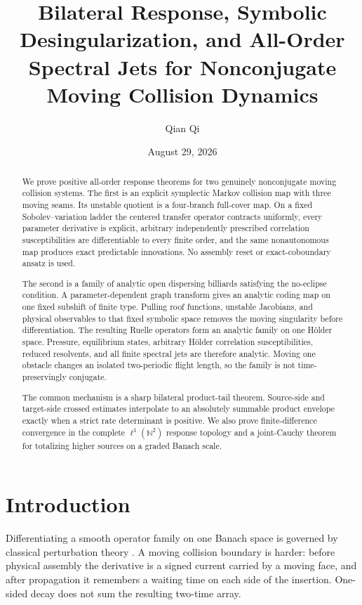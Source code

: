 \documentclass[11pt,reqno]{amsart}
\title[Bilateral response and symbolic desingularization]{Bilateral Response, Symbolic Desingularization, and All-Order Spectral Jets for Nonconjugate Moving Collision Dynamics}
\author{Qian Qi}
\date{August 29, 2026}
\theoremstyle{definition}
\theoremstyle{remark}
\newcommand{\N}{\mathbb N}
\begin{document}
\begin{abstract}
We prove positive all-order response theorems for two genuinely nonconjugate
moving collision systems.  The first is an explicit symplectic Markov collision
map with three moving seams.  Its unstable quotient is a four-branch full-cover
map.  On a fixed Sobolev--variation ladder the centered transfer operator
contracts uniformly, every parameter derivative is explicit, arbitrary
independently prescribed correlation susceptibilities are differentiable to
every finite order, and the same nonautonomous map produces exact predictable
innovations.  No assembly reset or exact-coboundary ansatz is used.

The second is a family of analytic open dispersing billiards satisfying the
no-eclipse condition.  A parameter-dependent graph transform gives an analytic
coding map on one fixed subshift of finite type.  Pulling roof functions,
unstable Jacobians, and physical observables to that fixed symbolic space
removes the moving singularity before differentiation.  The resulting Ruelle
operators form an analytic family on one Hölder space.  Pressure, equilibrium
states, arbitrary Hölder correlation susceptibilities, reduced resolvents, and
all finite spectral jets are therefore analytic.  Moving one obstacle changes
an isolated two-periodic flight length, so the family is not time-preservingly
conjugate.

The common mechanism is a sharp bilateral product-tail theorem.  Source-side
and target-side crossed estimates interpolate to an absolutely summable
product envelope exactly when a strict rate determinant is positive.  We also
prove finite-difference convergence in the complete $\ell^1(\N^2)$ response
topology and a joint-Cauchy theorem for totalizing higher sources on a graded
Banach scale.
\end{abstract}

\maketitle
\tableofcontents

\section{Introduction}

Differentiating a smooth operator family on one Banach space is governed by
classical perturbation theory \cite{Kato1995}.  A moving collision boundary is
harder: before physical assembly the derivative is a signed current carried by
a moving face, and after propagation it remembers a waiting time on each side
of the insertion.  One-sided decay does not sum the resulting two-time array.
\end{document}
